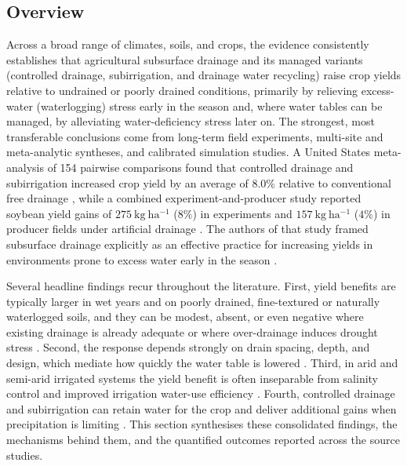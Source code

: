 \subsection{Overview}

Across a broad range of climates, soils, and crops, the evidence consistently establishes that agricultural subsurface drainage and its managed variants (controlled drainage, subirrigation, and drainage water recycling) raise crop yields relative to undrained or poorly drained conditions, primarily by relieving excess-water (waterlogging) stress early in the season and, where water tables can be managed, by alleviating water-deficiency stress later on. The strongest, most transferable conclusions come from long-term field experiments, multi-site and meta-analytic syntheses, and calibrated simulation studies. A United States meta-analysis of 154 pairwise comparisons found that controlled drainage and subirrigation increased crop yield by an average of \(8.0\%\) relative to conventional free drainage \parencite{Singh2022b}, while a combined experiment-and-producer study reported soybean yield gains of \(275\ \mathrm{kg\ ha^{-1}}\) (\(8\%\)) in experiments and \(157\ \mathrm{kg\ ha^{-1}}\) (\(4\%\)) in producer fields under artificial drainage \parencite{Mourtzinis2021}. The authors of that study framed subsurface drainage explicitly as an effective practice for increasing yields in environments prone to excess water early in the season \parencite{Mourtzinis2021}.

Several headline findings recur throughout the literature. First, yield benefits are typically larger in wet years and on poorly drained, fine-textured or naturally waterlogged soils, and they can be modest, absent, or even negative where existing drainage is already adequate or where over-drainage induces drought stress \parencite{JORJANI1991,Wiersma2010,Cordeiro2015,Kladivko2005}. Second, the response depends strongly on drain spacing, depth, and design, which mediate how quickly the water table is lowered \parencite{HARDJOAMIDJOJO1982,Skaggs2006,Rui2024,Acharya2019}. Third, in arid and semi-arid irrigated systems the yield benefit is often inseparable from salinity control and improved irrigation water-use efficiency \parencite{ELMOWELHI1988,Mathew2001,Yang2022,Liu2025}. Fourth, controlled drainage and subirrigation can retain water for the crop and deliver additional gains when precipitation is limiting \parencite{Kaur2021,Gunn2018,Gunn2019,Nelson2011}. This section synthesises these consolidated findings, the mechanisms behind them, and the quantified outcomes reported across the source studies.

